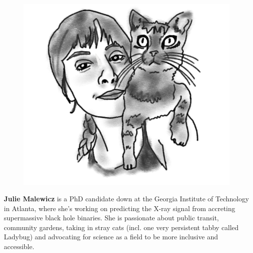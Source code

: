 \begin{figure}
\includegraphics[width=0.9\linewidth]{portraits/julie_and_bug.png}
\end{figure}
\textbf{Julie Malewicz}  is a PhD candidate down at the Georgia Institute of Technology in Atlanta, where she's working on predicting the X-ray signal from accreting supermassive black hole binaries. She is passionate about public transit, community gardens, taking in stray cats (incl. one very persistent tabby called Ladybug) and advocating for science as a field to be more inclusive and accessible. \\
\\

